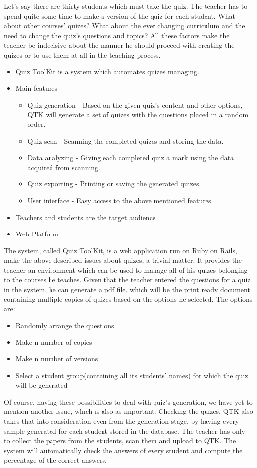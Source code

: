 Let’s say there are thirty students which must take the quiz. The teacher has to spend quite some time to make a version of the quiz for each student. What about other courses’ quizes? What about the ever changing curriculum and the need to change the quiz’s questions and topics? All these factors make the teacher be indecisive about the manner he should proceed with creating the quizes or to use them at all in the teaching process. 

\begin{itemize}
  \item Quiz ToolKit is a system which automates quizes managing.
  \item Main features
  \begin{itemize}
    \item Quiz generation - Based on the given quiz’s content and other options, QTK will generate a set of quizes with the questions placed in a random order.
    \item Quiz scan - Scanning the completed quizes and storing the data.
    \item Data analyzing - Giving each completed quiz a mark using the data acquired from scanning.
    \item Quiz exporting - Printing or saving the generated quizes.
    \item User interface - Easy access to the above mentioned features
  \end{itemize}
  \item Teachers and students are the target audience
  \item Web Platform
\end{itemize}

The system, called Quiz ToolKit,  is a web application run on Ruby on Rails, make the above described issues about quizes, a trivial matter. It provides the teacher an environment which can be used to manage all of his quizes belonging to the courses he teaches. Given that the teacher entered the questions for a quiz in the system, he can generate a pdf file, which will be the print ready document containing multiple copies of quizes based on the options he selected. The options are: 

\begin{itemize}
  \item Randomly arrange the questions
  \item Make n number of copies
  \item Make n number of versions
  \item Select a student group(containing all its students’ names) for which the quiz will be generated    
\end{itemize}

Of course, having these possibilities to deal with quiz’s generation, we have yet to mention another issue, which is also as important: Checking the quizes. QTK also takes that into consideration even from the generation stage, by having every sample generated for each student stored in the database. The teacher has only to collect the papers from the students, scan them and upload to QTK. The system will automatically check the answers of every student and compute the percentage of the correct answers.

\clearpage
